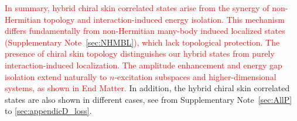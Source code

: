 \documentclass[longbibliography, aps, prx, amsmath, amssymb, amsfonts, twocolumn,superscriptaddress, footinbib]{revtex4-1}
\begin{document}
	\textcolor{red}{
	In summary, hybrid chiral skin correlated states arise from the 
	synergy of non-Hermitian topology and interaction-induced energy 
	isolation. This mechanism differs fundamentally from non-Hermitian 
	many-body induced localized states (Supplementary Note~\ref{sec:NHMBL}), 
	which lack topological protection. %
	The presence of chiral skin topology distinguishes our hybrid states 
    from purely interaction-induced localization.
	The amplitude enhancement and energy gap isolation extend naturally to 
	$n$-excitation subspaces and higher-dimensional systems, as shown in End Matter. 
	}
	In addition, the hybrid chiral skin correlated states are also shown in different cases, see from Supplementary Note~\ref{sec:AllP} to \ref{sec:appendicD_loss}.

\end{document}
